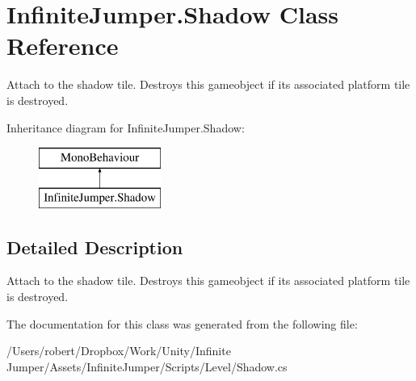 \hypertarget{class_infinite_jumper_1_1_shadow}{}\section{Infinite\+Jumper.\+Shadow Class Reference}
\label{class_infinite_jumper_1_1_shadow}


Attach to the shadow tile. Destroys this gameobject if its associated platform tile is destroyed.  


Inheritance diagram for Infinite\+Jumper.\+Shadow\+:\begin{figure}[H]
\begin{center}
\leavevmode
\includegraphics[height=2.000000cm]{class_infinite_jumper_1_1_shadow}
\end{center}
\end{figure}


\subsection{Detailed Description}
Attach to the shadow tile. Destroys this gameobject if its associated platform tile is destroyed. 



The documentation for this class was generated from the following file\+:\begin{DoxyCompactItemize}
\item 
/\+Users/robert/\+Dropbox/\+Work/\+Unity/\+Infinite Jumper/\+Assets/\+Infinite\+Jumper/\+Scripts/\+Level/Shadow.\+cs\end{DoxyCompactItemize}
